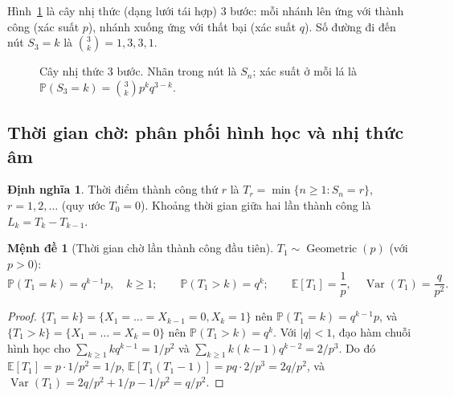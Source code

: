\documentclass[12pt,a4paper]{article}
\theoremstyle{definition}
\newtheorem{definition}{Định nghĩa}[section]
\newtheorem{proposition}{Mệnh đề}[section]
\theoremstyle{remark}
\newcommand{\Prob}{\mathbb{P}}
\newcommand{\E}{\mathbb{E}}
\newcommand{\Var}{\operatorname{Var}}
\newcommand{\Geo}{\operatorname{Geometric}}
\begin{document}
Hình~\ref{fig:tree} là cây nhị thức (dạng lưới tái hợp) 3 bước: mỗi nhánh lên ứng với thành công (xác suất
$p$), nhánh xuống ứng với thất bại (xác suất $q$). Số đường đi đến nút $S_3=k$ là $\binom{3}{k}=1,3,3,1$.

\begin{figure}[ht]
\centering
{}
\caption{Cây nhị thức 3 bước. Nhãn trong nút là $S_n$; xác suất ở mỗi lá là $\Prob(S_3=k)=\binom{3}{k}p^kq^{3-k}$.}
\label{fig:tree}
\end{figure}

\subsection{Thời gian chờ: phân phối hình học và nhị thức âm}
\begin{definition}
Thời điểm thành công thứ $r$ là $T_r = \min\{n \ge 1: S_n = r\}$, $r = 1,2,\dots$ (quy ước $T_0 = 0$).
Khoảng thời gian giữa hai lần thành công là $L_k = T_k - T_{k-1}$.
\end{definition}

\begin{proposition}[Thời gian chờ lần thành công đầu tiên]\label{prop:geo}
$T_1 \sim \Geo(p)$ (với $p>0$):
\begin{equation}\label{eq:geo}
  \Prob(T_1 = k) = q^{k-1}p,\quad k\ge 1;\qquad \Prob(T_1 > k) = q^k;\qquad
  \E[T_1] = \frac1p,\quad \Var(T_1) = \frac{q}{p^2}.
\end{equation}
\end{proposition}
\begin{proof}
$\{T_1 = k\} = \{X_1 = \dots = X_{k-1} = 0, X_k = 1\}$ nên $\Prob(T_1=k)=q^{k-1}p$, và
$\{T_1 > k\} = \{X_1=\dots=X_k=0\}$ nên $\Prob(T_1>k)=q^k$. Với $|q|<1$, đạo hàm chuỗi hình học cho
$\sum_{k\ge1} kq^{k-1} = 1/p^2$ và $\sum_{k\ge1}k(k-1)q^{k-2} = 2/p^3$. Do đó $\E[T_1] = p\cdot 1/p^2 = 1/p$,
$\E[T_1(T_1-1)] = pq\cdot 2/p^3 = 2q/p^2$, và
$\Var(T_1) = 2q/p^2 + 1/p - 1/p^2 = q/p^2$.
\end{proof}
\end{document}
